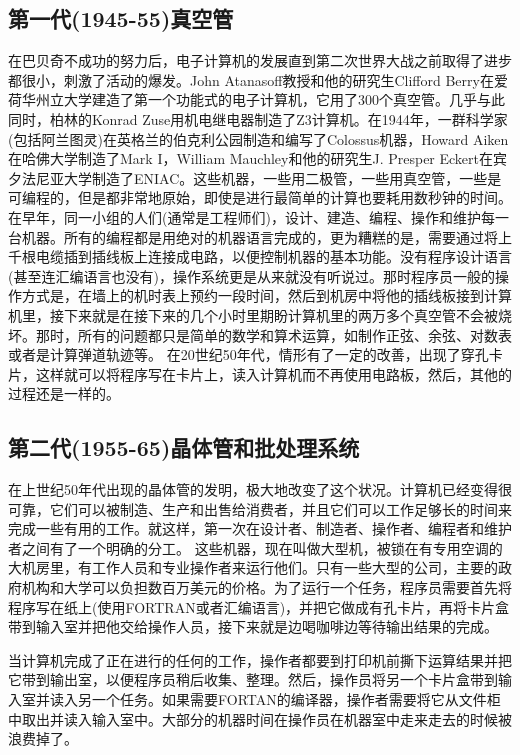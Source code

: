 \subsection{第一代(1945-55)真空管}

	在巴贝奇不成功的努力后，电子计算机的发展直到第二次世界大战之前取得了进步都很小，刺激了活动的爆发。John Atanasoff教授和他的研究生Clifford Berry在爱荷华州立大学建造了第一个功能式的电子计算机，它用了300个真空管。几乎与此同时，柏林的Konrad Zuse用机电继电器制造了Z3计算机。在1944年，一群科学家(包括阿兰图灵)在英格兰的伯克利公园制造和编写了Colossus机器，Howard Aiken在哈佛大学制造了Mark I，William Mauchley和他的研究生J. Presper Eckert在宾夕法尼亚大学制造了ENIAC。这些机器，一些用二极管，一些用真空管，一些是可编程的，但是都非常地原始，即使是进行最简单的计算也要耗用数秒钟的时间。
	在早年，同一小组的人们(通常是工程师们)，设计、建造、编程、操作和维护每一台机器。所有的编程都是用绝对的机器语言完成的，更为糟糕的是，需要通过将上千根电缆插到插线板上连接成电路，以便控制机器的基本功能。没有程序设计语言(甚至连汇编语言也没有)，操作系统更是从来就没有听说过。那时程序员一般的操作方式是，在墙上的机时表上预约一段时间，然后到机房中将他的插线板接到计算机里，接下来就是在接下来的几个小时里期盼计算机里的两万多个真空管不会被烧坏。那时，所有的问题都只是简单的数学和算术运算，如制作正弦、余弦、对数表或者是计算弹道轨迹等。
	在20世纪50年代，情形有了一定的改善，出现了穿孔卡片，这样就可以将程序写在卡片上，读入计算机而不再使用电路板，然后，其他的过程还是一样的。
	
\subsection{第二代(1955-65)晶体管和批处理系统}

	在上世纪50年代出现的晶体管的发明，极大地改变了这个状况。计算机已经变得很可靠，它们可以被制造、生产和出售给消费者，并且它们可以工作足够长的时间来完成一些有用的工作。就这样，第一次在设计者、制造者、操作者、编程者和维护者之间有了一个明确的分工。
	这些机器，现在叫做大型机，被锁在有专用空调的大机房里，有工作人员和专业操作者来运行他们。只有一些大型的公司，主要的政府机构和大学可以负担数百万美元的价格。为了运行一个任务，程序员需要首先将程序写在纸上(使用FORTRAN或者汇编语言)，并把它做成有孔卡片，再将卡片盒带到输入室并把他交给操作人员，接下来就是边喝咖啡边等待输出结果的完成。
	
	当计算机完成了正在进行的任何的工作，操作者都要到打印机前撕下运算结果并把它带到输出室，以便程序员稍后收集、整理。然后，操作员将另一个卡片盒带到输入室并读入另一个任务。如果需要FORTAN的编译器，操作者需要将它从文件柜中取出并读入输入室中。大部分的机器时间在操作员在机器室中走来走去的时候被浪费掉了。

